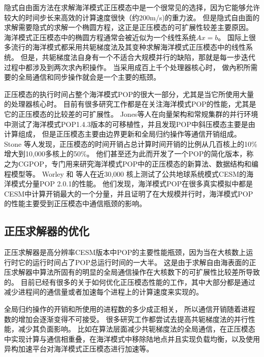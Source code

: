 隐式自由面方法在求解海洋模式正压模态中是一个很常见的选择，因为它能够允许较大的时间步长来高效的计算速度很快（约200m/s)的重力波。
但是隐式自由面的求解需要隐式的求解一个椭圆方程，这正是正压模态的可扩展性较差主要原因。 
海洋模式正压模态中的椭圆方程通常会被近似为一个线性系统$Ax=b$。 
国际上很多流行的海洋模式都采用共轭梯度法及其变种求解海洋模式正压模态中的线性系统\citep{adcroft2014mitgcm,lai2010nonhydrostatic,madec1997ocean}。
但是，共轭梯度法自身有一个不适合大规模并行的缺陷，那就是每一步迭代过程中都涉及到两次求內积操作。 
当采用成百上千个处理器核心时， 做內积所需要的全局通信和同步操作就会是一个主要的瓶颈。

正压模态的执行时间占整个海洋模式POP的很大一部分，尤其是当它所使用大量的处理器核心时。
目前有很多研究工作都是在关注海洋模式POP的性能，尤其是它的正压模态的比较差的可扩展性。 
Jones\cite{pop05}等人在向量架构和常规集群的并行环境中测试了海洋模式POP1.4.3版本的可移植性，并且发现POP中斜压模态主要是由计算组成， 但是正压模态主要由边界更新和全局归约操作等通信开销组成。
Stone  \cite{stone2011cgpop}等人发现，正压模态的时间开销占总计算时间开销的比例从几百核上的10\%增大到10,000多核上的50\%。 
他们甚至还为此而开发了一个POP的简化版本，称之为CGPOP，专门用来研究海洋模式POP中的正压模态的新算法、数据结构和编程模型等。 
Worley  \cite{Worley:2011:PCE:2063384.2063457} 和 \cite{dennis2012computational} 等人在近30,000 核上测试了公共地球系统模式CESM的海洋模式分量POP 2.0.1的性能。 
他们发现，海洋模式POP在很多真实模拟中都是CESM中计算开销最大的一个分量，并且证明了在大规模并行时，海洋模式POP的性能主要受到正压模态中通信瓶颈的影响。 

\subsection{正压求解器的优化}
\label{related:improve}


正压求解器是高分辨率CESM版本中POP的主要性能瓶颈，因为当在大核数上运行时它的运行时间占了POP总运行时间的一大半。 
这是由于求解自由海表面的正压求解器中算法所固有的明显的全局通信操作在大核数下的可扩展性比较差所导致的。
目前已经有很多的关于如何优化正压模态性能的工作，其中大部分都是通过减少进程间的通信量或者加速每个进程上的计算速度来实现的。 

全局归约操作的开销和所使用的进程数的多少成正相关， 所以通信开销随着进程数的增加会逐渐变得不可接受。
很多研究工作都尝试去提高共轭梯度法的并行性能，减少其负面影响。 
比如在算法层面减少共轭梯度法的全局通信\cite{dAzevedo1999lapack}，在正压模态中实现计算与通信相重叠\cite{beare1997optimisation}，在海洋模式中移除陆地点并且实现负载均衡\cite{dennis2007inverse, dennis2008scaling}，以及使用异构加速平台对海洋模式正压模态进行加速等。

